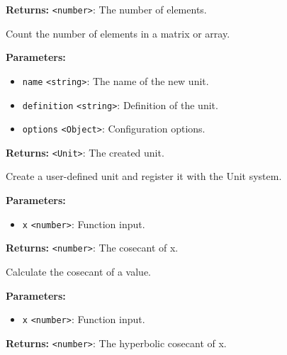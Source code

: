 \documentclass[12pt,a4paper]{article}
\begin{document}
\noindent \textbf{Returns:} \texttt{<number>}: The number of elements.

\noindent Count the number of elements in a matrix or array.

\vspace{5mm}
\noindent {}


\noindent \textbf{Parameters:}
\begin{itemize}
  \item \texttt{name} \texttt{<string>}: The name of the new unit.
  \item \texttt{definition} \texttt{<string>}: Definition of the unit.
  \item \texttt{options} \texttt{<Object>}: Configuration options.
\end{itemize}

\noindent \textbf{Returns:} \texttt{<Unit>}: The created unit.

\noindent Create a user-defined unit and register it with the Unit system.

\vspace{5mm}
\noindent {}


\noindent \textbf{Parameters:}
\begin{itemize}
  \item \texttt{x} \texttt{<number>}: Function input.
\end{itemize}

\noindent \textbf{Returns:} \texttt{<number>}: The cosecant of x.

\noindent Calculate the cosecant of a value.

\vspace{5mm}
\noindent {}


\noindent \textbf{Parameters:}
\begin{itemize}
  \item \texttt{x} \texttt{<number>}: Function input.
\end{itemize}

\noindent \textbf{Returns:} \texttt{<number>}: The hyperbolic cosecant of x.
\end{document}
